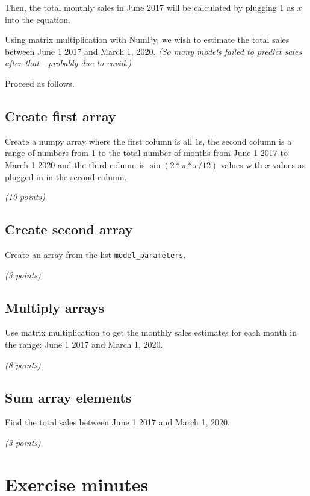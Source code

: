 \documentclass[
  letterpaper,
  DIV=11,
  numbers=noendperiod]{scrreprt}
\begin{document}
Then, the total monthly sales in June 2017 will be calculated by
plugging 1 as \(x\) into the equation.

Using matrix multiplication with NumPy, we wish to estimate the total
sales between June 1 2017 and March 1, 2020. \emph{(So many models
failed to predict sales after that - probably due to covid.)}

Proceed as follows.

\hypertarget{create-first-array}{%
\subsection{Create first array}\label{create-first-array}}

Create a numpy array where the first column is all \(1\)s, the second
column is a range of numbers from 1 to the total number of months from
June 1 2017 to March 1 2020 and the third column is \(\sin(2*\pi*x/12)\)
values with \(x\) values as plugged-in in the second column.

\emph{(10 points)}

\hypertarget{create-second-array}{%
\subsection{Create second array}\label{create-second-array}}

Create an array from the list \texttt{model\_parameters}.

\emph{(3 points)}

\hypertarget{multiply-arrays}{%
\subsection{Multiply arrays}\label{multiply-arrays}}

Use matrix multiplication to get the monthly sales estimates for each
month in the range: June 1 2017 and March 1, 2020.

\emph{(8 points)}

\hypertarget{sum-array-elements}{%
\subsection{Sum array elements}\label{sum-array-elements}}

Find the total sales between June 1 2017 and March 1, 2020.

\emph{(3 points)}

\hypertarget{exercise-minutes}{%
\section{Exercise minutes}\label{exercise-minutes}}
\end{document}

